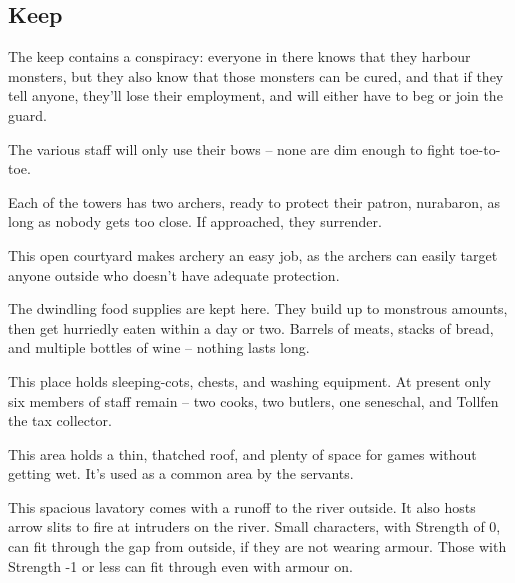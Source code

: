 \begin{multicols}{2}
\subsection{ Keep}

The keep contains a conspiracy: everyone in there knows that they harbour monsters, but they also know that those monsters can be cured, and that if they tell anyone, they'll lose their employment, and will either have to beg or join the \gls{guard}.

The various staff will only use their bows -- none are dim enough to fight toe-to-toe.



Each of the towers has two archers, ready to protect their patron, \gls{nurabaron}, as long as nobody gets too close.
If approached, they surrender.



This open courtyard makes archery an easy job, as the archers can easily target anyone outside who doesn't have adequate protection.


The dwindling food supplies are kept here.  They build up to monstrous amounts, then get hurriedly eaten within a day or two.  Barrels of meats, stacks of bread, and multiple bottles of wine -- nothing lasts long.


This place holds sleeping-cots, chests, and washing equipment.
At present only six members of staff remain -- two cooks, two butlers, one seneschal, and Tollfen the tax collector.


This area holds a thin, thatched roof, and plenty of space for games without getting wet.
It's used as a common area by the servants.


This spacious lavatory comes with a runoff to the river outside.
It also hosts arrow slits to fire at intruders on the river.
Small characters, with Strength of 0, can fit through the gap from outside, if they are not wearing armour.
Those with Strength -1 or less can fit through even with armour on.


\end{multicols}
